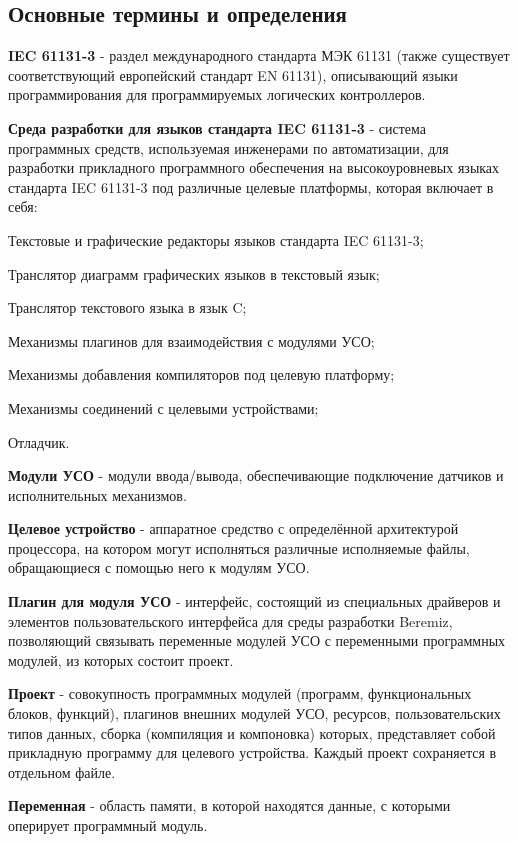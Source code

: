 \documentclass[letterpaper,10pt,russian]{sphinxmanual}
\begin{document}
\subsection{Основные термины и определения}
\label{usage_guide/terms_and_definitions::doc}\label{usage_guide/terms_and_definitions:id1}
\textbf{IEC 61131-3} - раздел международного стандарта МЭК 61131 (также
существует соответствующий европейский стандарт EN 61131), описывающий
языки программирования для программируемых логических контроллеров.

\textbf{Среда разработки для языков стандарта IEC 61131-3} - система
программных средств, используемая инженерами по автоматизации, для
разработки прикладного программного обеспечения на высокоуровневых
языках стандарта IEC 61131-3 под различные целевые платформы, которая
включает в себя:

Текстовые и графические редакторы языков стандарта IEC 61131-3;

Транслятор диаграмм графических языков в текстовый язык;

Транслятор текстового языка в язык C;

Механизмы плагинов для взаимодействия с модулями УСО;

Механизмы добавления компиляторов под целевую платформу;

Механизмы соединений с целевыми устройствами;

Отладчик.

\textbf{Модули УСО} - модули ввода/вывода, обеспечивающие подключение
датчиков и исполнительных механизмов.

\textbf{Целевое устройство} - аппаратное средство с определённой архитектурой
процессора, на котором могут исполняться различные исполняемые файлы,
обращающиеся с помощью него к модулям УСО.

\textbf{Плагин для модуля УСО} - интерфейс, состоящий из специальных
драйверов и элементов пользовательского интерфейса для среды разработки
Beremiz, позволяющий связывать переменные модулей УСО с переменными
программных модулей, из которых состоит проект.

\textbf{Проект} - совокупность программных модулей (программ, функциональных
блоков, функций), плагинов внешних модулей УСО, ресурсов,
пользовательских типов данных, сборка (компиляция и компоновка) которых,
представляет собой прикладную программу для целевого устройства. Каждый
проект сохраняется в отдельном файле.

\textbf{Переменная} - область памяти, в которой находятся данные, с которыми
оперирует программный модуль.
\end{document}

